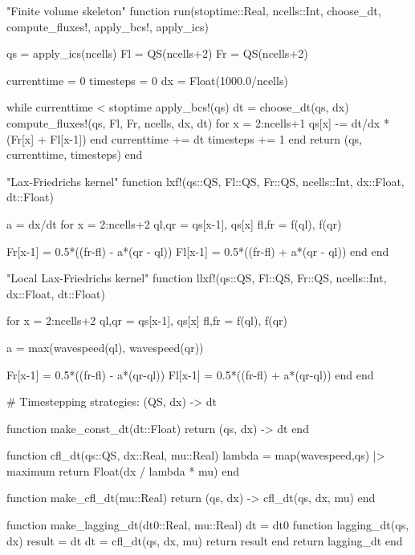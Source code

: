 \begin{myjulia}

"Finite volume skeleton"
function run(stoptime::Real, ncells::Int, choose_dt,
             compute_fluxes!, apply_bcs!, apply_ics)

    qs = apply_ics(ncells)
    Fl = QS(ncells+2)
    Fr = QS(ncells+2)

    currenttime = 0
    timesteps = 0
    dx = Float(1000.0/ncells)
    
    while currenttime < stoptime
        apply_bcs!(qs)
        dt = choose_dt(qs, dx)
        compute_fluxes!(qs, Fl, Fr, ncells, dx, dt)
        for x = 2:ncells+1
            qs[x] -= dt/dx * (Fr[x] + Fl[x-1])
        end
        currenttime += dt
        timesteps += 1
    end
    return (qs, currenttime, timesteps)
end
\end{myjulia}
\begin{myjulia}

"Lax-Friedrichs kernel"
function lxf!(qs::QS, Fl::QS, Fr::QS, 
              ncells::Int, dx::Float, dt::Float)
    
    a = dx/dt
    for x = 2:ncells+2
        ql,qr = qs[x-1], qs[x]
        fl,fr = f(ql), f(qr)        

        Fr[x-1] = 0.5*((fr-fl) - a*(qr - ql))
        Fl[x-1] = 0.5*((fr-fl) + a*(qr - ql))
    end
end

\end{myjulia}
\newpage
\begin{myjulia}

"Local Lax-Friedrichs kernel"
function llxf!(qs::QS, Fl::QS, Fr::QS, 
               ncells::Int, dx::Float, dt::Float)
    
    for x = 2:ncells+2
        ql,qr = qs[x-1], qs[x]
        fl,fr = f(ql), f(qr)

        a = max(wavespeed(ql), wavespeed(qr))

        Fr[x-1] = 0.5*((fr-fl) - a*(qr-ql))
        Fl[x-1] = 0.5*((fr-fl) + a*(qr-ql))
    end
end
\end{myjulia}
\begin{myjulia}
# Timestepping strategies: (QS, dx) -> dt

function make_const_dt(dt::Float)
    return (qs, dx) -> dt
end

function cfl_dt(qs::QS, dx::Real, mu::Real)
    lambda = map(wavespeed,qs) |> maximum
    return Float(dx / lambda * mu)
end

function make_cfl_dt(mu::Real)
    return (qs, dx) -> cfl_dt(qs, dx, mu)
end

function make_lagging_dt(dt0::Real, mu::Real)
    dt = dt0
    function lagging_dt(qs, dx)
        result = dt
        dt = cfl_dt(qs, dx, mu)
        return result
    end
    return lagging_dt
end
\end{myjulia}

